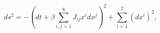 \begin{equation}
\label{metn4M1}
ds^2 = - \left( dt + \beta \sum_{i,j=1}^{8} J_{ij} x^i dx^j \right)^2
+ \sum_{i=1}^\sharp (dx^i)^2, 
\end{equation}

